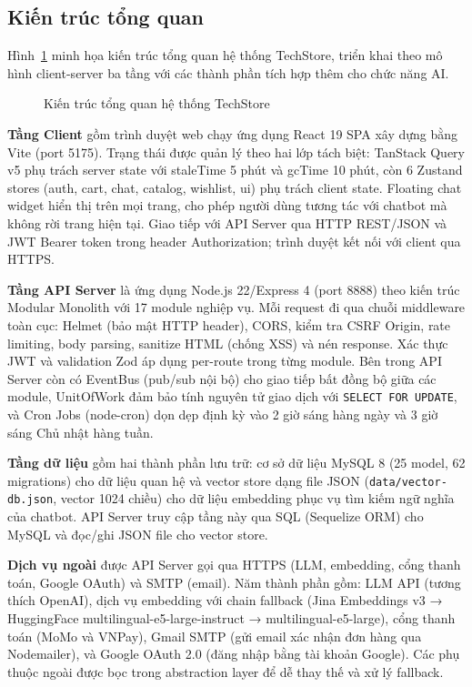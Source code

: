 \subsection{Kiến trúc tổng quan}

Hình~\ref{fig:system_architecture} minh họa kiến trúc tổng quan hệ thống TechStore, triển khai theo mô hình client-server ba tầng với các thành phần tích hợp thêm cho chức năng AI.

\begin{figure}[H]
  \centering
  \caption{Kiến trúc tổng quan hệ thống TechStore}
  \label{fig:system_architecture}
\end{figure}

\textbf{Tầng Client} gồm trình duyệt web chạy ứng dụng React 19 SPA xây dựng bằng Vite (port 5175). Trạng thái được quản lý theo hai lớp tách biệt: TanStack Query v5 phụ trách server state với staleTime 5 phút và gcTime 10 phút, còn 6 Zustand stores (auth, cart, chat, catalog, wishlist, ui) phụ trách client state. Floating chat widget hiển thị trên mọi trang, cho phép người dùng tương tác với chatbot mà không rời trang hiện tại. Giao tiếp với API Server qua HTTP REST\slash JSON và JWT Bearer token trong header Authorization; trình duyệt kết nối với client qua HTTPS.

\textbf{Tầng API Server} là ứng dụng Node.js 22\slash Express 4 (port 8888) theo kiến trúc Modular Monolith với 17 module nghiệp vụ. Mỗi request đi qua chuỗi middleware toàn cục: Helmet (bảo mật HTTP header), CORS, kiểm tra CSRF Origin, rate limiting, body parsing, sanitize HTML (chống XSS) và nén response. Xác thực JWT và validation Zod áp dụng per-route trong từng module. Bên trong API Server còn có EventBus (pub/sub nội bộ) cho giao tiếp bất đồng bộ giữa các module, UnitOfWork đảm bảo tính nguyên tử giao dịch với \texttt{SELECT FOR UPDATE}, và Cron Jobs (node-cron) dọn dẹp định kỳ vào 2 giờ sáng hàng ngày và 3 giờ sáng Chủ nhật hàng tuần.

\textbf{Tầng dữ liệu} gồm hai thành phần lưu trữ: cơ sở dữ liệu MySQL 8 (25 model, 62 migrations) cho dữ liệu quan hệ và vector store dạng file JSON (\texttt{data/vector-db.json}, vector 1024 chiều) cho dữ liệu embedding phục vụ tìm kiếm ngữ nghĩa của chatbot. API Server truy cập tầng này qua SQL (Sequelize ORM) cho MySQL và đọc\slash ghi JSON file cho vector store.

\textbf{Dịch vụ ngoài} được API Server gọi qua HTTPS (LLM, embedding, cổng thanh toán, Google OAuth) và SMTP (email). Năm thành phần gồm: LLM API (tương thích OpenAI), dịch vụ embedding với chain fallback (Jina Embeddings v3 → HuggingFace multilingual-e5-large-instruct → multilingual-e5-large), cổng thanh toán (MoMo và VNPay), Gmail SMTP (gửi email xác nhận đơn hàng qua Nodemailer), và Google OAuth 2.0 (đăng nhập bằng tài khoản Google). Các phụ thuộc ngoài được bọc trong abstraction layer để dễ thay thế và xử lý fallback.

